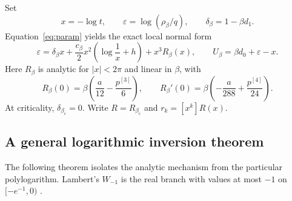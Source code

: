 \documentclass[11pt,a4paper]{article}
\numberwithin{equation}{section}
\theoremstyle{definition}
\theoremstyle{remark}
\newcommand{\bc}{\beta_{\mathrm c}}
\newcommand{\eps}{\varepsilon}
\begin{document}
Set
\begin{equation}\label{eq:coordinates}
 x=-\log t,\qquad \eps=\log(\rho_\beta/q),\qquad
 \delta_\beta=1-\beta d_1.
\end{equation}
Equation~\eqref{eq:param} yields the exact local normal form
\begin{equation}\label{eq:normal}
 \boxed{\quad
 \eps=\delta_\beta x+\frac{c_\beta}{2}x^2
     \left(\log\frac1x+h\right)+x^3R_\beta(x),
 \qquad U_\beta=\beta d_0+\eps-x.
 \quad}
\end{equation}
Here $R_\beta$ is analytic for $|x|<2\pi$ and linear in $\beta$, with
\begin{equation}\label{eq:rcoeff}
 R_\beta(0)=\beta\left(\frac a{12}-\frac{p^{[3]}}6\right),\qquad
 R_\beta'(0)=\beta\left(-\frac a{288}+\frac{p^{[4]}}{24}\right).
\end{equation}
At criticality, $\delta_{\bc}=0$. Write $R=R_{\bc}$ and $r_k=[x^k]R(x)$.

\subsection{A general logarithmic inversion theorem}
The following theorem isolates the analytic mechanism from the particular
polylogarithm. Lambert's $W_{-1}$ is the real branch with values at most
$-1$ on $[-e^{-1},0)$ \cite{dlmfw}.
\end{document}
